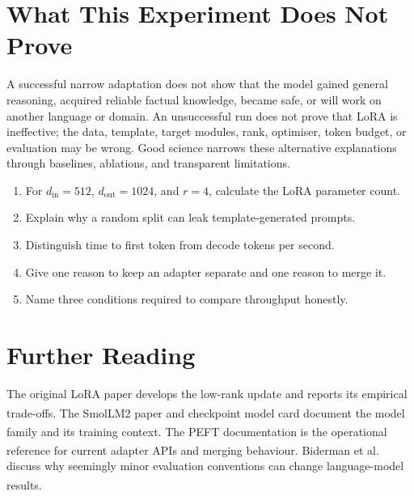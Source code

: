 \section{What This Experiment Does Not Prove}

A successful narrow adaptation does not show that the model gained general
reasoning, acquired reliable factual knowledge, became safe, or will work on
another language or domain.
An unsuccessful run does not prove that LoRA is ineffective; the data,
template, target modules, rank, optimiser, token budget, or evaluation may be
wrong.
Good science narrows these alternative explanations through baselines,
ablations, and transparent limitations.

\begin{checkpoint}
\begin{enumerate}
    \item For $d_{\mathrm{in}}=512$, $d_{\mathrm{out}}=1024$, and $r=4$,
          calculate the LoRA parameter count.
    \item Explain why a random split can leak template-generated prompts.
    \item Distinguish time to first token from decode tokens per second.
    \item Give one reason to keep an adapter separate and one reason to merge
          it.
    \item Name three conditions required to compare throughput honestly.
\end{enumerate}
\end{checkpoint}

\section{Further Reading}

The original LoRA paper develops the low-rank update and reports its empirical
trade-offs.\textsuperscript{\cite{huLoRALowRank2021}}
The SmolLM2 paper and checkpoint model card document the model family and its
training
context.\textsuperscript{\cite{benallalSmolLM2WhenSmol2025,
huggingfaceSmolLM2135MInstruct2026}}
The PEFT documentation is the operational reference for current adapter APIs
and merging behaviour.\textsuperscript{\cite{huggingfacePEFTLoRA2026}}
Biderman et al. discuss why seemingly minor evaluation conventions can change
language-model
results.\textsuperscript{\cite{bidermanLessonsTrenchesReproducible2026}}
